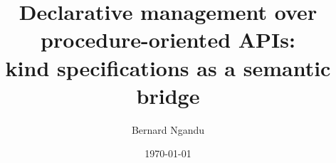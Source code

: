 \documentclass[11pt,a4paper]{article}
\title{Declarative management over procedure-oriented APIs:\\kind specifications as a semantic bridge}
\author{Bernard Ngandu}
\date{\today}
\begin{document}
\maketitle

\begin{abstract}

\end{abstract}















\end{document}
